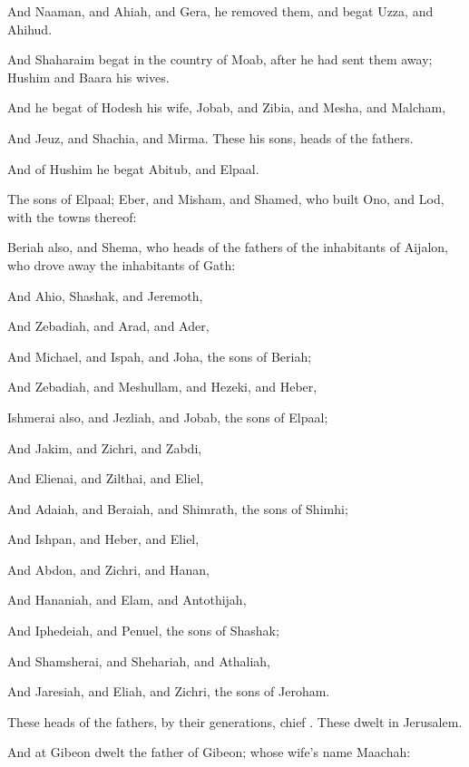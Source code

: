 {And
Naaman, and
Ahiah, and
Gera, he
removed them, and
begat
Uzza, and
Ahihud.

And
Shaharaim
begat
{} in the
country of
Moab,
after he had sent them
away;
Hushim and
Baara
{} his
wives.

And he
begat of
Hodesh his
wife,
Jobab, and
Zibia, and
Mesha, and
Malcham,

And
Jeuz, and
Shachia, and
Mirma. These
{} his
sons,
heads of the
fathers.

And of
Hushim he
begat
Abitub, and
Elpaal.

The
sons of
Elpaal;
Eber, and
Misham, and
Shamed, who
built
Ono, and
Lod, with the
towns thereof:

Beriah also, and
Shema,
who
{}
heads of the
fathers of the
inhabitants of
Aijalon, who drove
away the
inhabitants of
Gath:

And
Ahio,
Shashak, and
Jeremoth,

And
Zebadiah, and
Arad, and
Ader,

And
Michael, and
Ispah, and
Joha, the
sons of
Beriah;

And
Zebadiah, and
Meshullam, and
Hezeki, and
Heber,

Ishmerai also, and
Jezliah, and
Jobab, the
sons of
Elpaal;

And
Jakim, and
Zichri, and
Zabdi,

And
Elienai, and
Zilthai, and
Eliel,

And
Adaiah, and
Beraiah, and
Shimrath, the
sons of
Shimhi;

And
Ishpan, and
Heber, and
Eliel,

And
Abdon, and
Zichri, and
Hanan,

And
Hananiah, and
Elam, and
Antothijah,

And
Iphedeiah, and
Penuel, the
sons of
Shashak;

And
Shamsherai, and
Shehariah, and
Athaliah,

And
Jaresiah, and
Eliah, and
Zichri, the
sons of
Jeroham.

These
{}
heads of the
fathers, by their
generations,
chief
{}. These
dwelt in
Jerusalem.

And at
Gibeon
dwelt the
father of
Gibeon; whose
wife’s
name
{}
Maachah:

}
